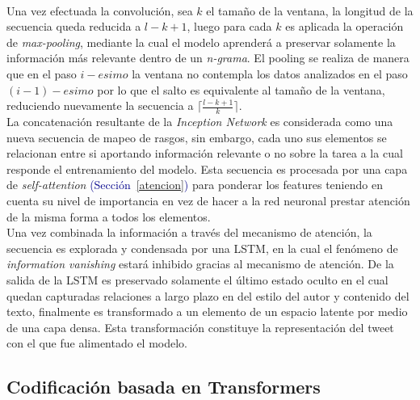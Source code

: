 	\\
	Una vez efectuada la convolución, sea $k$ el tamaño de la ventana, la longitud de la secuencia queda reducida a $l-k + 1$, luego para cada $k$ es aplicada la operación de \textit{max-pooling}, mediante la cual el modelo aprenderá a preservar solamente la información más relevante dentro de un \textit{n-grama}. El pooling se realiza de manera que en el paso $i-esimo$ la ventana no contempla los datos analizados en el paso $(i-1) -esimo$ por lo que el salto es equivalente al tamaño de la ventana, reduciendo nuevamente la secuencia a $\lceil\frac{l - k + 1}{k}\rceil$.
	\\
	La concatenación resultante de la\textit{ Inception Network} es considerada como una nueva secuencia de mapeo de rasgos, sin embargo, cada uno sus elementos se relacionan entre si aportando información relevante o no sobre la tarea a la cual responde el entrenamiento del modelo. Esta secuencia es procesada por una capa de \textit{self-attention} \textcolor{darkblue}{(Sección~\ref{atencion})} para ponderar los features teniendo en cuenta su nivel de importancia en vez de hacer a la red neuronal prestar atención de la misma forma a todos los elementos.
	\\
	Una vez combinada la información a través del mecanismo de atención, la secuencia es explorada y condensada por una LSTM, en la cual el fenómeno de \textit{information vanishing} estará inhibido gracias al mecanismo de atención. De la salida de la LSTM es preservado solamente el último estado oculto en el cual quedan capturadas relaciones a largo plazo en del estilo del autor y contenido del texto, finalmente es transformado a un elemento de un espacio latente por medio de una capa densa. Esta transformación constituye la representación del tweet con el que fue alimentado el modelo. 
	
	\subsection{Codificación basada en Transformers}\label{ref_trans}
	
